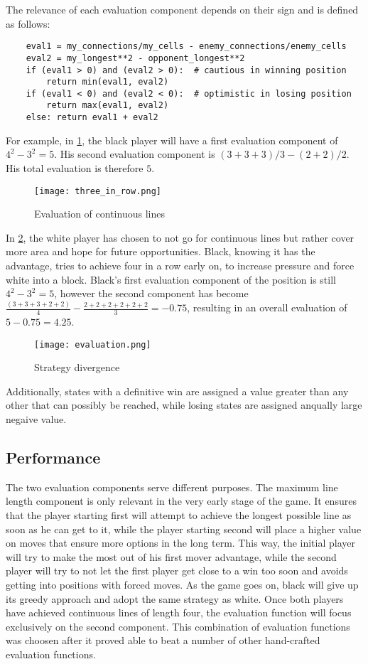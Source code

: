 The relevance of each evaluation component depends on their sign and is defined as follows:
\begin{verbatim}
    eval1 = my_connections/my_cells - enemy_connections/enemy_cells
    eval2 = my_longest**2 - opponent_longest**2
    if (eval1 > 0) and (eval2 > 0):  # cautious in winning position
        return min(eval1, eval2)
    if (eval1 < 0) and (eval2 < 0):  # optimistic in losing position
        return max(eval1, eval2)
    else: return eval1 + eval2
\end{verbatim}

For example, in \ref{fig:tree_in_row}, the black player will have a first evaluation component of $4^2 - 3^2 = 5$. His second evaluation component is $(3 + 3 + 3) / 3 - (2 + 2) / 2$. His total evaluation is therefore $5$.
\begin{figure}[H]
    \centering
    \texttt{[image: three\_in\_row.png]}
    \caption{Evaluation of continuous lines}
    \label{fig:tree_in_row}
\end{figure}

In \ref{fig:evaluation}, the white player has chosen to not go for continuous lines but rather cover more area and hope for future opportunities. Black, knowing it has the advantage, tries to achieve four in a row early on, to increase pressure and force white into a block. Black's first evaluation component of the position is still $4^2 - 3^2 = 5$, however the second component has become $\frac{(3 + 3 + 3 + 2 + 2)}{4} - \frac{2 + 2 + 2 + 2 + 2 + 2}{3} = -0.75$, resulting in an overall evaluation of $5 - 0.75 = 4.25$.
\begin{figure}[H]
    \centering
    \texttt{[image: evaluation.png]}
    \caption{Strategy divergence}
    \label{fig:evaluation}
\end{figure}

Additionally, states with a definitive win are assigned a value greater than any other that can possibly be reached, while losing states are assigned anqually large negaive value.

\subsection{Performance}
The two evaluation components serve different purposes. The maximum line length component is only relevant in the very early stage of the game. It ensures that the player starting first will attempt to achieve the longest possible line as soon as he can get to it, while the player starting second will place a higher value on moves that ensure more options in the long term. This way, the initial player will try to make the most out of his first mover advantage, while the second player will try to not let the first player get close to a win too soon and avoids getting into positions with forced moves. As the game goes on, black will give up its greedy approach and adopt the same strategy as white. Once both players have achieved continuous lines of length four, the evaluation function will focus exclusively on the second component. This combination of evaluation functions was choosen after it proved able to beat a number of other hand-crafted evaluation functions.